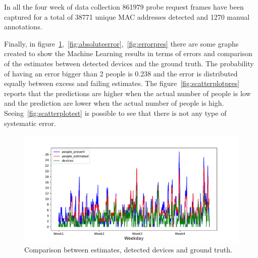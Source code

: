 In all the four week of data collection 861979 probe request frames have been captured for a total of 38771 unique MAC addresses detected and 1270 manual annotations.


Finally, in figure~\ref{fig:comparison},~\ref{fig:absoluteerror},~\ref{fig:errorpres} there are some graphs created to show the Machine Learning results in terms of errors and comparison of the estimates between detected devices and the ground truth. The probability of having an error bigger than 2 people is 0.238 and the error is distributed equally between excess and failing estimates. The figure~\ref{fig:scatterplotpres} reports that the predictions are higher when the actual number of people is low and the prediction are lower when the actual number of people is high. Seeing~\ref{fig:scatterplotest} is possible to see that there is not any type of systematic error.

\begin{figure}[H]
\centering 
\includegraphics[width=1\textwidth]{images/comparison} 
\caption{Comparison between estimates, detected devices and ground truth.}
\label{fig:comparison}
\end{figure}


